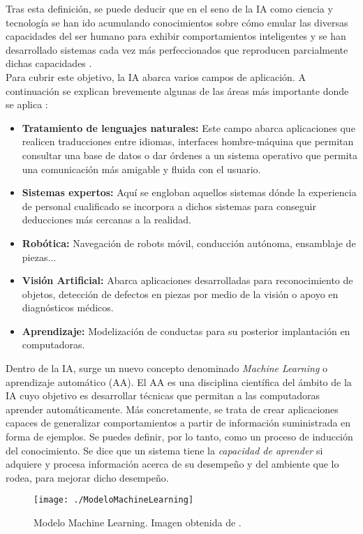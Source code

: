 \documentclass[a4paper, 12pt, spanish, chapterprefix, numbers=noenddot]{book}
\begin{document}
Tras esta definición, se puede deducir que en el seno de la IA como ciencia y tecnología se han ido acumulando conocimientos sobre cómo emular las diversas capacidades del ser humano para exhibir comportamientos inteligentes y se han desarrollado sistemas cada vez más perfeccionados que reproducen parcialmente dichas capacidades \cite{IA}.\\

Para cubrir este objetivo, la IA abarca varios campos de aplicación. A continuación se explican brevemente algunas de las áreas más importante donde se aplica \cite{IA_2}:
\begin{itemize}
\item \textbf{Tratamiento de lenguajes naturales:} Este campo abarca aplicaciones que realicen traducciones entre idiomas, interfaces hombre-máquina que permitan consultar una base de datos o dar órdenes a un sistema operativo que permita una comunicación más amigable y fluida con el usuario.
\item \textbf{Sistemas expertos:} Aquí se engloban aquellos sistemas dónde la experiencia de personal cualificado se incorpora a dichos sistemas para conseguir deducciones más cercanas a la realidad.
\item \textbf{Robótica:} Navegación de robots móvil, conducción autónoma, ensamblaje de piezas...
\item \textbf{Visión Artificial:} Abarca aplicaciones desarrolladas para reconocimiento de objetos, detección de defectos en piezas por medio de la visión o apoyo en diagnósticos médicos.
\item \textbf{Aprendizaje:} Modelización de conductas para su posterior implantación en computadoras.  
\end{itemize}

Dentro de la IA, surge un nuevo concepto denominado \textit{Machine Learning} o aprendizaje automático (AA). El AA es una disciplina científica del ámbito de la IA cuyo objetivo es desarrollar técnicas que permitan a las computadoras aprender automáticamente. Más concretamente, se trata de crear aplicaciones capaces de generalizar comportamientos a partir de información suministrada en forma de ejemplos. Se puedes definir, por lo tanto, como un proceso de inducción del conocimiento. Se dice que un sistema tiene la \textit{capacidad de aprender} si adquiere y procesa información acerca de su desempeño y del ambiente que lo rodea, para mejorar dicho desempeño.\\

\begin{figure}[H]
\begin{center}
\texttt{[image: ./ModeloMachineLearning]}
\caption{Modelo Machine Learning. Imagen obtenida de \cite{ML}.}
\label{ModeloMachineLearning}
\end{center}
\end{figure}
\end{document}
